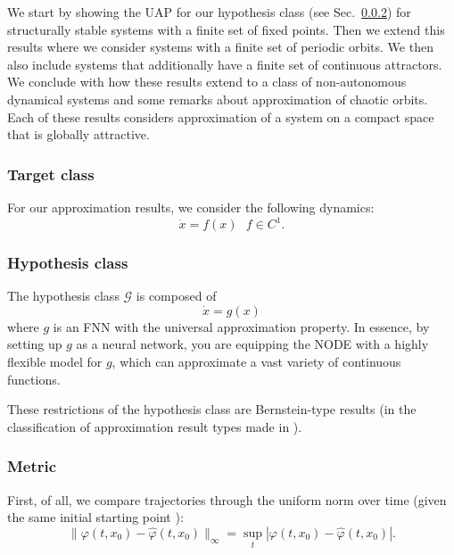 \documentclass{article}
\theoremstyle{definition}
\theoremstyle{remark}
\newcounter{ct}
\begin{document}
We start by showing the UAP for our hypothesis class (see Sec.~\ref{sec:hypothesis}) for structurally stable systems with a finite set of fixed points.
Then we extend this results where we consider systems with a finite set of periodic orbits.
We then also include systems that additionally have a finite set of continuous attractors.
We conclude with how these results extend to a class of non-autonomous dynamical systems and some remarks about approximation of chaotic orbits.
Each of these results considers approximation of a system on a compact space that is globally attractive. %



\subsubsection{Target class}\label{sec:target}
For our approximation results, we consider the following dynamics:
\begin{equation}
\dot x = f(x)   \ \ \ f\in C^1.
\end{equation}


\subsubsection{Hypothesis class}\label{sec:hypothesis}
The hypothesis class $\mathcal{G}$ is composed of
\begin{equation}
\dot x = g(x) 
\end{equation}
where $g$ is an FNN with the universal approximation property.
In essence, by setting up $g$ as a neural network, you are equipping the NODE with a highly flexible model for $g$, which can approximate a vast variety of continuous functions. 

These restrictions of the hypothesis class are Bernstein-type results (in the classification of approximation result types made in \citep{jiang2023brief}).


\subsubsection{Metric}\label{sec:metric}
First, of all, we compare trajectories through the uniform norm over time (given the same initial starting point \citep{girard2007approximation}):
\begin{equation}
\|\varphi(t,x_0)-\hat \varphi(t,x_0)\|_\infty = \sup_t|\varphi(t,x_0)-\hat \varphi(t,x_0)|.
\end{equation}
\end{document}
